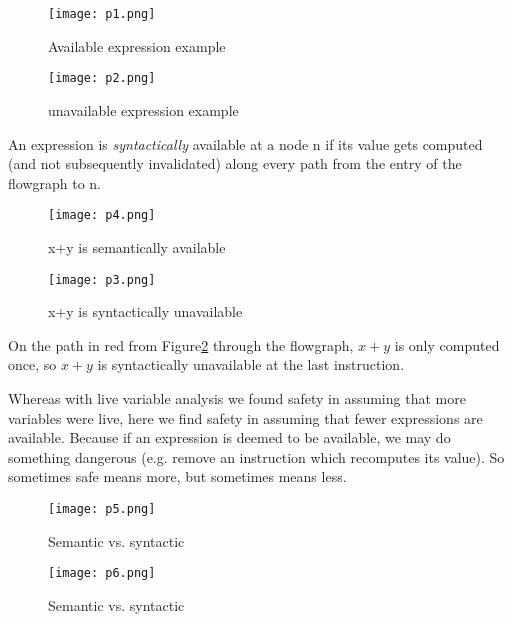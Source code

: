 \begin{figure}[!htb]
      \texttt{[image: p1.png]}
      \caption{Available expression example}\label{fig:p1}
    \endminipage\hfill
      \texttt{[image: p2.png]}
      \caption{unavailable expression example}\label{fig:p2}
    \endminipage
\end{figure}


An expression is \textit{syntactically} available at a node n if its value gets computed 
(and not subsequently invalidated) along every path from the entry of the flowgraph to n.


\begin{figure}[!htb]
      \texttt{[image: p4.png]}
      \caption{x+y is semantically available}\label{fig:p4}
    \endminipage\hfill
      \texttt{[image: p3.png]}
      \caption{x+y is syntactically unavailable}\label{fig:p3}
    \endminipage
\end{figure}


On the path in red from Figure\ref{fig:p3} through the flowgraph, \(x+y\) is only
computed once, so \(x+y\) is syntactically unavailable at the last instruction.


Whereas with live variable analysis we found safety in assuming that 
more variables were live, here we find safety in assuming that fewer
expressions are available. Because if an expression is deemed to be available, we
may do something dangerous (e.g. remove an instruction which recomputes its value).
So sometimes safe means more, but sometimes means less.

\begin{figure}[H]
      \texttt{[image: p5.png]}
      \caption{Semantic vs. syntactic}\label{fig:p5}
    \endminipage\hfill
      \texttt{[image: p6.png]}
      \caption{Semantic vs. syntactic}\label{fig:p6}
    \endminipage
\end{figure}


